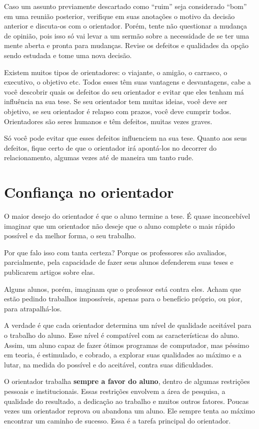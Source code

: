 Caso um assunto previamente descartado como “ruim” seja considerado “bom” em uma reunião posterior, verifique em suas anotações o motivo da decisão anterior e discuta-os com o orientador. Porém, tente não questionar a mudança de opinião, pois isso só vai levar a um sermão sobre a necessidade de se ter uma mente aberta e pronta para mudanças. Revise os defeitos e qualidades da opção sendo estudada e tome uma nova decisão.


Existem muitos tipos de orientadores: o viajante, o amigão, o carrasco, o executivo, o objetivo etc. Todos esses têm suas vantagens e desvantagens, cabe a você descobrir quais os defeitos do seu orientador e evitar que eles tenham má influência na sua tese. Se seu orientador tem muitas ideias, você deve ser objetivo, se seu orientador é relapso com prazos, você deve cumprir todos. Orientadores são seres humanos e têm defeitos, muitas vezes graves. 


Só você pode evitar que esses defeitos influenciem na sua tese. Quanto aos seus defeitos, fique certo de que o orientador irá apontá-los no decorrer do relacionamento, algumas vezes até de maneira um tanto rude.


\section{Confiança no orientador}


O maior desejo do orientador é que o aluno termine a tese. É quase inconcebível imaginar que um orientador não deseje que o aluno complete o mais rápido possível e da melhor forma, o seu trabalho. 


Por que falo isso com tanta certeza? Porque os professores são avaliados, parcialmente, pela capacidade de fazer seus alunos defenderem suas teses e publicarem artigos sobre elas.


Alguns alunos, porém, imaginam que o professor está contra eles. Acham que estão pedindo trabalhos impossíveis, apenas para o benefício próprio, ou pior, para atrapalhá-los.


A verdade é que cada orientador determina um nível de qualidade aceitável para o trabalho do aluno. Esse nível é compatível com as características do aluno. 
Assim, um aluno capaz de fazer ótimos programas de computador, mas péssimo em teoria, é estimulado, e cobrado, a explorar suas qualidades ao máximo e a lutar, na medida do possível e do aceitável, contra suas dificuldades.


O orientador trabalha \textbf{sempre a favor do aluno}, dentro de algumas restrições pessoais e institucionais. 
Essas restrições envolvem a área de pesquisa, a qualidade do resultado, a dedicação ao trabalho e muitos outros fatores. 
Poucas vezes um orientador reprova ou abandona um aluno.
 Ele sempre tenta ao máximo encontrar um caminho de sucesso. 
 Essa é a tarefa principal do orientador.


